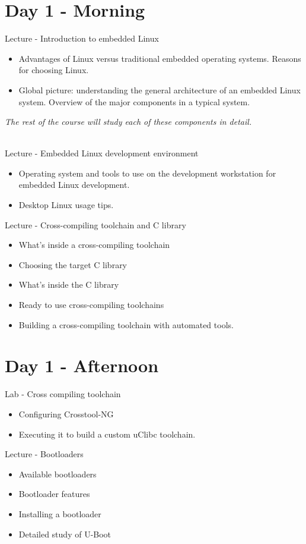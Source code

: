 \documentclass[a4paper,12pt,obeyspaces,spaces,hyphens]{article}
\begin{document}
\section{Day 1 - Morning}

\feagendaonecolumn
{Lecture - Introduction to embedded Linux}
{
  \begin{itemize}
  \item Advantages of Linux versus traditional embedded operating systems.
        Reasons for choosing Linux.
  \item Global picture: understanding the general architecture of an
        embedded Linux system. Overview of the major components in a typical
        system.
  \end{itemize}
  {\em The rest of the course will study each of these components in detail.}
}
\\
\feagendatwocolumn
{Lecture - Embedded Linux development environment}
{
  \begin{itemize}
  \item Operating system and tools to use on the development
        workstation for embedded Linux development.
  \item Desktop Linux usage tips.
  \end{itemize}
}
{Lecture - Cross-compiling toolchain and C library}
{
  \begin{itemize}
  \item What's inside a cross-compiling toolchain
  \item Choosing the target C library
  \item What's inside the C library
  \item Ready to use cross-compiling toolchains
  \item Building a cross-compiling toolchain with automated tools.
  \end{itemize}
}

\section{Day 1 - Afternoon}
\feagendatwocolumn
{Lab - Cross compiling toolchain}
{
  \begin{itemize}
  \item Configuring Crosstool-NG
  \item Executing it to build a custom uClibc toolchain.
  \end{itemize}
}
{Lecture - Bootloaders}
{
  \begin{itemize}
  \item Available bootloaders
  \item Bootloader features
  \item Installing a bootloader
  \item Detailed study of U-Boot
  \end{itemize}
}
\\
\end{document}

